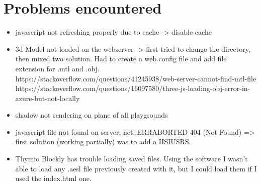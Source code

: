 \documentclass{scrartcl}
\begin{document}
\section{Problems encountered}
\begin{itemize}
  \item javascript not refreshing properly due to cache -> disable cache
  \item 3d Model not loaded on the webserver -> first tried to change the directory, then mixed two solution. 
        Had to create a web.config file and add file extension for .mtl and .obj.
        https://stackoverflow.com/questions/41245938/web-server-cannot-find-mtl-file
        https://stackoverflow.com/questions/16097580/three-js-loading-obj-error-in-azure-but-not-locally
  \item shadow not rendering on plane of all playgrounds
  \item javascript file not found on server, net::ERR\textunderscore ABORTED 404 (Not Found) => first solution (working partially) was to add a IIS\textunderscore IUSRS.
  \item Thymio Blockly has trouble loading saved files. Using the software I wasn't able to load any .aesl file previously created with it, but I could load them if I used the index.html one.
\end{itemize}

\printbibliography[heading=bibintoc]
\end{document}
